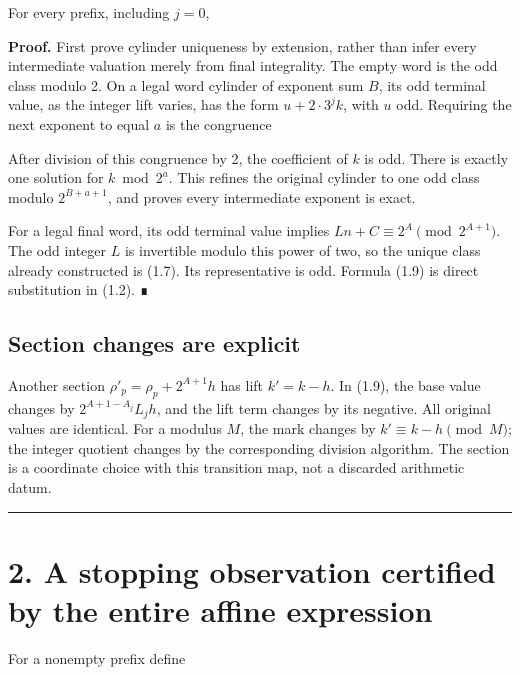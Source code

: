 For every prefix, including \(j=0\),


\textbf{Proof.} First prove cylinder uniqueness by extension, rather
than infer every intermediate valuation merely from final integrality.
The empty word is the odd class modulo 2. On a legal word cylinder of
exponent sum \(B\), its odd terminal value, as the integer lift varies,
has the form \(u+2\cdot3^j k\), with \(u\) odd. Requiring the next
exponent to equal \(a\) is the congruence


After division of this congruence by 2, the coefficient of \(k\) is odd.
There is exactly one solution for \(k\bmod 2^a\). This refines the
original cylinder to one odd class modulo \(2^{B+a+1}\), and proves
every intermediate exponent is exact.

For a legal final word, its odd terminal value implies
\(Ln+C\equiv2^A\pmod {2^{A+1}}\). The odd integer \(L\) is invertible
modulo this power of two, so the unique class already constructed is
(1.7). Its representative is odd. Formula (1.9) is direct substitution
in (1.2). ∎

\subsection{Section changes are explicit}

Another section \(\rho'_p=\rho_p+2^{A+1}h\) has lift \(k'=k-h\). In
(1.9), the base value changes by \(2^{A+1-A_j}L_jh\), and the lift term
changes by its negative. All original values are identical. For a
modulus \(M\), the mark changes by \(k'\equiv k-h\pmod M\); the integer
quotient changes by the corresponding division algorithm. The section is
a coordinate choice with this transition map, not a discarded arithmetic
datum.

\begin{center}\rule{0.5\linewidth}{0.5pt}\end{center}

\section{2. A stopping observation certified by the entire affine
expression}

For a nonempty prefix define



